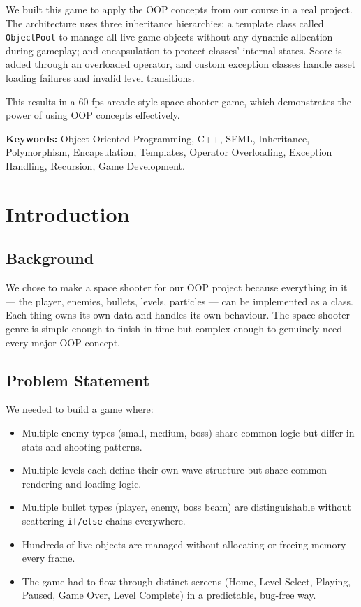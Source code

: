 \documentclass[11pt]{article}
\begin{document}
We built this game to apply the OOP concepts from our course in a real project.
The architecture uses three inheritance hierarchies; a template
class called \texttt{ObjectPool} to manage all live game objects without any dynamic allocation during gameplay; and encapsulation to protect classes' internal states. Score is added through an overloaded
operator, and custom exception classes handle asset loading failures and invalid
level transitions.

This results in a 60 fps arcade style space shooter game, which demonstrates the power of using OOP concepts effectively.

\vspace{0.3cm}
\noindent\textbf{Keywords:} Object-Oriented Programming, C++, SFML, Inheritance,
Polymorphism, Encapsulation, Templates, Operator Overloading, Exception Handling, Recursion,
Game Development.

\newpage

\tableofcontents
\newpage

\clearpage
\section{Introduction}

\subsection{Background}

We chose to make a space shooter for our OOP project because everything in it --- the player, enemies, bullets, levels, particles ---
can be implemented as a class. Each thing owns its own data and handles its own
behaviour. The space shooter genre is simple enough to finish in time but
complex enough to genuinely need every major OOP concept.

\subsection{Problem Statement}

We needed to build a game where:
\begin{itemize}
    \item Multiple enemy types (small, medium, boss) share common logic but differ in stats and shooting patterns.
    \item Multiple levels each define their own wave structure but share common rendering and loading logic.
    \item Multiple bullet types (player, enemy, boss beam) are distinguishable
          without scattering \texttt{if/else} chains everywhere.
    \item Hundreds of live objects are managed without allocating or freeing memory every frame.
    \item The game had to flow through distinct screens (Home, Level Select, Playing,
          Paused, Game Over, Level Complete) in a predictable, bug-free way.
\end{itemize}
\end{document}
